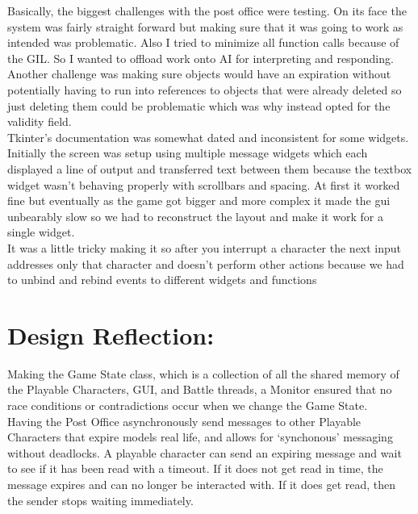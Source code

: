 \documentclass{article}
\theoremstyle{definition}
\begin{document}
Basically, the biggest challenges with the post office were testing. 
On its face the system was fairly straight forward but making sure that it 
was going to work as intended was problematic. Also I tried to minimize all 
function calls because of the GIL. So I wanted to offload work onto AI for 
interpreting and responding. \\

Another challenge was making sure objects would have an expiration without 
potentially having to run into references to objects that were already deleted 
so just deleting them could be problematic which was why instead opted for the 
validity field. \\

Tkinter's documentation was somewhat dated and inconsistent for some widgets.\\

Initially the screen was setup using multiple message widgets which each displayed a line of output and transferred text between them because the textbox widget wasn't behaving properly with scrollbars and spacing. At first it worked fine but eventually as the game got bigger and more complex it made the gui unbearably slow so we had to reconstruct the layout and make it work for a single widget.\\

It was a little tricky making it so after you interrupt a character the next input addresses only that character and doesn't perform other actions because we had to unbind and rebind events to different widgets and functions\\
\section*{\huge{Design Reflection:}}

Making the Game State class, which is a collection of all the shared memory of the
Playable Characters, GUI, and Battle threads, a Monitor ensured that no race conditions
or contradictions occur when we change the Game State. \\

Having the Post Office asynchronously send messages to other Playable Characters
that expire models real life, and allows for `synchonous' messaging without
deadlocks. A playable character can send an expiring message and wait to see if
it has been read with a timeout. If it does not get read in time, the message
expires and can no longer be interacted with. If it does get read, then the sender
stops waiting immediately.  \\
\end{document}
